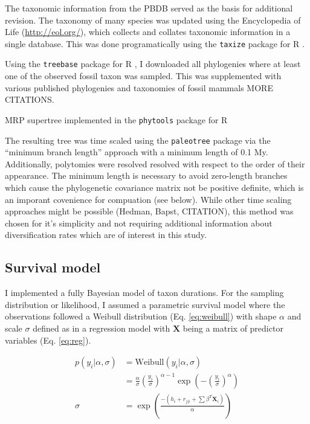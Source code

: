 \documentclass[12pt,letterpaper]{article}
\begin{document}
The taxonomic information from the PBDB served as the basis for additional revision. The taxonomy of many species was updated using the Encyclopedia of Life (\url{http://eol.org/}), which collects and collates taxonomic information in a single database. This was done programatically using the \texttt{taxize} package for R \citep{2013taxize}.

Using the \texttt{treebase} package for R \citep{boettiger2014treebase}, I downloaded all phylogenies where at least one of the observed fossil taxon was sampled. This was supplemented with various published phylogenies and taxonomies of fossil mammals \citep{Raia2012f,Janis1998,Janis2008} MORE CITATIONS.

MRP supertree implemented in the \texttt{phytools} package for R \citep{revell2012phytools}

The resulting tree was time scaled using the \texttt{paleotree} package via the ``minimum branch length'' approach with a minimum length of 0.1 My. Additionally, polytomies were resolved resolved with respect to the order of their appearance. The minimum length is necessary to avoid zero-length branches which cause the phylogenetic covariance matrix not be positive definite, which is an imporant covenience for compuation (see below). 
While other time scaling approaches might be possible (Hedman, Bapst, CITATION), this method was chosen for it's simplicity and not requiring additional information about diversification rates which are of interest in this study. 



\subsection{Survival model}

I implemented a fully Bayesian model of taxon durations. For the sampling distribution or likelihood, I assumed a parametric survival model where the observations followed a Weibull distribution (Eq. \ref{eq:weibull}) with shape \(\alpha\) and scale \(\sigma\) defined as in a regression model with \(\mathbf{X}\) being a matrix of predictor variables (Eq. \ref{eq:reg}).  %

\begin{align}
  p(y_{i}|\alpha, \sigma) &= \mathrm{Weibull}(y_{i}|\alpha, \sigma) \nonumber \\ 
  &= \frac{\alpha}{\sigma} \left(\frac{y_{i}}{\sigma}\right)^{\alpha - 1} \exp\left(-\left(\frac{y_{i}}{\sigma}\right)^{\alpha}\right) \label{eq:weibull}\\
  \sigma &= \exp\left(\frac{-(h_{i} + r_{j | i} + \sum \beta^{T} \mathbf{X}_{i})}{\alpha}\right) \label{eq:reg}
\end{align}
\end{document}
